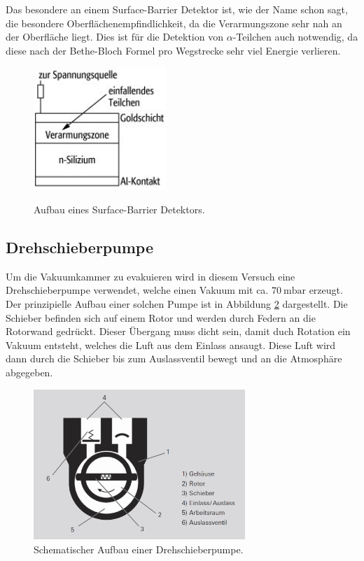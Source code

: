 Das besondere an einem Surface-Barrier Detektor ist, wie der Name schon
sagt, die besondere Oberflächenempfindlichkeit, da die Verarmungszone sehr nah an der Oberfläche liegt.
Dies ist für die Detektion von $\alpha$-Teilchen auch notwendig, da diese nach der Bethe-Bloch Formel
pro Wegstrecke sehr viel Energie verlieren.

\begin{figure}[H]
  \centering
  \includegraphics[width=5cm]{detektor.png}
  \caption{Aufbau eines Surface-Barrier Detektors.}
  \label{fig:detektor}
  \cite{detektor}
\end{figure}

\subsection{Drehschieberpumpe}
Um die Vakuumkammer zu evakuieren wird in diesem Versuch eine Drehschieberpumpe verwendet, welche
einen Vakuum mit ca. $\SI{70}{\milli\bar}$ erzeugt. Der prinzipielle Aufbau einer solchen Pumpe ist in
Abbildung \ref{fig:Drehschieber} dargestellt. Die Schieber befinden sich auf einem Rotor und werden
durch Federn an die Rotorwand gedrückt. Dieser Übergang muss dicht sein, damit duch Rotation ein
Vakuum entsteht, welches die Luft aus dem Einlass ansaugt. Diese Luft wird dann durch die Schieber
bis zum Auslassventil bewegt und an die Atmosphäre abgegeben.

\begin{figure}[H]
  \centering
  \includegraphics[width=8cm]{Drehschieber.png}
  \caption{Schematischer Aufbau einer Drehschieberpumpe.}
  \label{fig:Drehschieber}
\end{figure}
